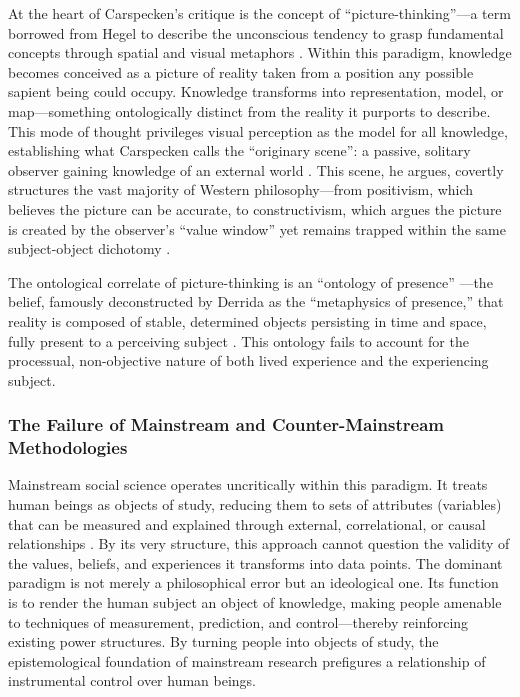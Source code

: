 \documentclass[12pt]{book}
\begin{document}
At the heart of Carspecken's critique is the concept of ``picture-thinking''—a term borrowed from Hegel to describe the unconscious tendency to grasp fundamental concepts through spatial and visual metaphors \parencite{carspecken_limits_2016, Carspecken2018}. Within this paradigm, knowledge becomes conceived as a picture of reality taken from a position any possible sapient being could occupy. Knowledge transforms into representation, model, or map—something ontologically distinct from the reality it purports to describe. This mode of thought privileges visual perception as the model for all knowledge, establishing what Carspecken calls the ``originary scene'': a passive, solitary observer gaining knowledge of an external world \parencite{Carspecken1995aa, Carspecken1999}. This scene, he argues, covertly structures the vast majority of Western philosophy—from positivism, which believes the picture can be accurate, to constructivism, which argues the picture is created by the observer's ``value window'' yet remains trapped within the same subject-object dichotomy \parencite{Carspecken1995aa, Carspecken1999, carspecken_limits_2016}.

The ontological correlate of picture-thinking is an ``ontology of presence'' \parencite{Carspecken2018}—the belief, famously deconstructed by Derrida as the ``metaphysics of presence,'' that reality is composed of stable, determined objects persisting in time and space, fully present to a perceiving subject \parencite{Carspecken1995aa, Carspecken1999}. This ontology fails to account for the processual, non-objective nature of both lived experience and the experiencing subject.

\subsubsection{The Failure of Mainstream and Counter-Mainstream Methodologies}\label{the-failure-of-mainstream-and-counter-mainstream-methodologies}

Mainstream social science operates uncritically within this paradigm. It treats human beings as objects of study, reducing them to sets of attributes (variables) that can be measured and explained through external, correlational, or causal relationships \parencite{Carspecken1995aa}. By its very structure, this approach cannot question the validity of the values, beliefs, and experiences it transforms into data points. The dominant paradigm is not merely a philosophical error but an ideological one. Its function is to render the human subject an object of knowledge, making people amenable to techniques of measurement, prediction, and control—thereby reinforcing existing power structures. By turning people into objects of study, the epistemological foundation of mainstream research prefigures a relationship of instrumental control over human beings.
\end{document}
